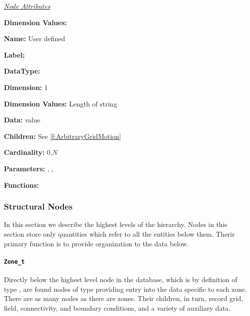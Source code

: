 \textit{\uline{Node Attributes}}
\begin{Ventryic}{\textbf{Dimension Values:}}
\item [\textbf{Name:}]
      User defined
\item [\textbf{Label:}]
\item [\textbf{DataType:}]
\item [\textbf{Dimension:}]
      1
\item [\textbf{Dimension Values:}]
      Length of string
\item [\textbf{Data:}]
       value
\item [\textbf{Children:}]
      See \autoref{f:ArbitraryGridMotion}
\item [\textbf{Cardinality:}]
      0,$N$
\item [\textbf{Parameters:}]
      , , 
\item [\textbf{Functions:}]
\end{Ventryic}

\subsubsection{Structural Nodes}

In this section we describe the highest levels of the hierarchy. Nodes
in this section store only quantities which refer to all the entities
below them. Therir primary function is to provide organization to the
data below.

\paragraph{\texttt{Zone\_t}}
\label{s:Zone}

Directly below the highest level node in the database, which is
by definition of type , are found nodes of type
 providing entry into the data specific to each
zone. There are as many  nodes as there are zones. Their
children, in turn, record grid, field, connectivity, and boundary
conditions, and a variety of auxiliary data.

